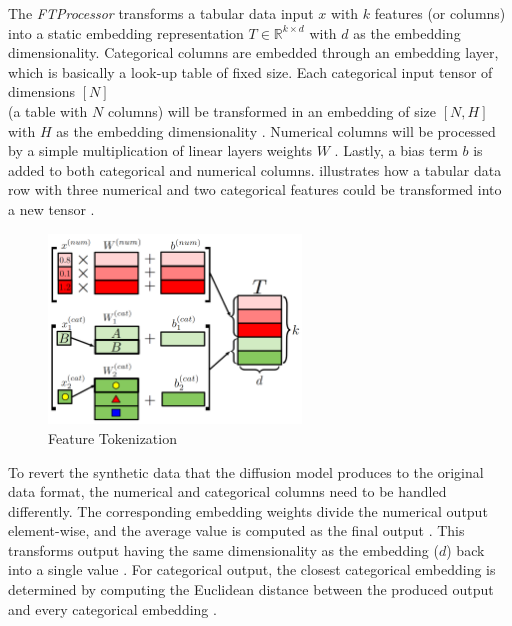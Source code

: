 The \textit{FTProcessor} transforms a tabular data input $x$ with $k$ features (or columns) into a static embedding representation $T \in \mathbb{R}^{k\times d}$ with $d$ as the embedding dimensionality.
Categorical columns are embedded through an embedding layer, which is basically a look-up table \cite{pytorch2023EmbeddingPyTorch13} of fixed size.
Each categorical input tensor of dimensions $[N]$ \\(\ie a table with $N$ columns) will be transformed in an embedding of size $[N,H]$ with $H$ as the embedding dimensionality \cite{gorishniy2021RevisitingDeepLearning}.
Numerical columns will be processed by a simple multiplication of linear layers weights $W$ \cite{gorishniy2021RevisitingDeepLearning}.
Lastly, a bias term $b$ is added to both categorical and numerical columns.
 illustrates how a tabular data row with three numerical and two categorical features could be transformed into a new tensor \cite[Figure 2a, p.4]{gorishniy2021RevisitingDeepLearning}.

\begin{figure}[h]
	\centering
	\includegraphics[width=0.6\textwidth]{images/ft.png}
	\caption[Feature Tokenization]{Feature Tokenization \cite[Figure 2a, p.4]{gorishniy2021RevisitingDeepLearning}}
	\label{fig:ft}
\end{figure}

To revert the synthetic data that the diffusion model produces to the original data format, the numerical and categorical columns need to be handled differently.
The corresponding embedding weights divide the numerical output element-wise, and the average value is computed as the final output \cite{zheng2022DiffusionModelsMissing}.
This transforms output having the same dimensionality as the embedding ($d$) back into a single value \cite{zheng2022DiffusionModelsMissing}.
For categorical output, the closest categorical embedding is determined by computing the Euclidean distance between the produced output and every categorical embedding \cite{zheng2022DiffusionModelsMissing}.

